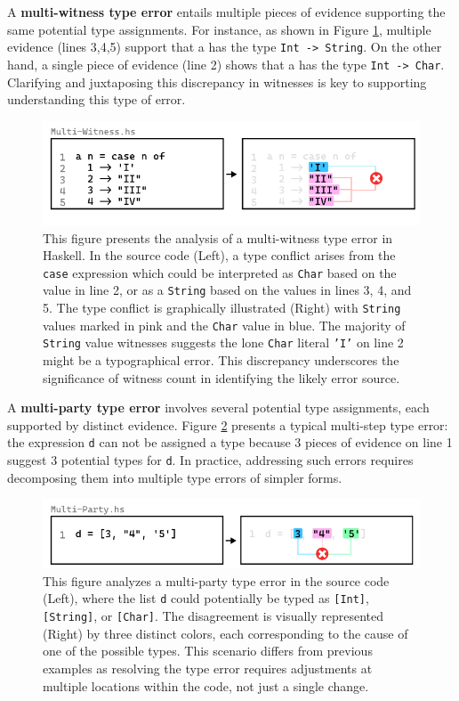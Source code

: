 A \textbf{multi-witness type error} entails multiple pieces of evidence supporting the same potential type assignments. For instance, as shown in Figure \ref{fig:multi-witness-example}, multiple evidence (lines 3,4,5) support that a has the type \texttt{Int -> String}. On the other hand, a single piece of evidence (line 2) shows that a has the type \texttt{Int -> Char}.  Clarifying and juxtaposing this discrepancy in witnesses is key to supporting understanding this type of error.

\begin{figure}[hbt]
  \includegraphics[width=\linewidth]{Multi-Witness}
  \caption{
    \label{fig:multi-witness-example}
    This figure presents the analysis of a multi-witness type error in Haskell. In the source code (Left), a type conflict arises from the \texttt{case} expression which could be interpreted as \texttt{Char} based on the value in line 2, or as a \texttt{String} based on the values in lines 3, 4, and 5. The type conflict is graphically illustrated (Right) with \texttt{String} values marked in pink and the \texttt{Char} value in blue. The majority of \texttt{String} value witnesses suggests the lone \texttt{Char} literal \texttt{'I'} on line 2 might be a typographical error. This discrepancy underscores the significance of witness count in identifying the likely error source.}
\end{figure}

A \textbf{multi-party type error} involves several potential type assignments, each supported by distinct evidence.  Figure \ref{fig:multi-party-example} presents a typical multi-step type error: the expression \texttt{d} can not be assigned a type because 3 pieces of evidence on line 1 suggest 3 potential types for \texttt{d}. In practice, addressing such errors requires decomposing them into multiple type errors of simpler forms.


\begin{figure}[hbt]
  \includegraphics[width=\linewidth]{Multi-Party}
  \caption{
    \label{fig:multi-party-example}
    This figure analyzes a multi-party type error in the source code (Left), where the list \texttt{d} could potentially be typed as \texttt{[Int]}, \texttt{[String]}, or \texttt{[Char]}. The disagreement is visually represented (Right) by three distinct colors, each corresponding to the cause of one of the possible types. This scenario differs from previous examples as resolving the type error requires adjustments at multiple locations within the code, not just a single change.
       }
\end{figure}

